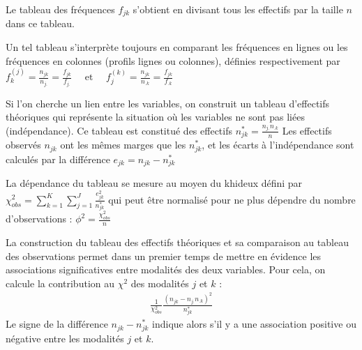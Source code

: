 \documentclass[letterpaper,10pt,french]{sphinxmanual}
\begin{document}
\sphinxAtStartPar
Le tableau des fréquences \(f_{jk}\) s’obtient en divisant tous les effectifs par la taille \(n\) dans ce tableau.

\sphinxAtStartPar
Un tel tableau s’interprète toujours en comparant les fréquences en lignes ou les fréquences en colonnes (profils lignes ou colonnes), définies  respectivement par
\(f_k^{(j)}= \frac{n_{jk}}{n_{j.}}=\frac{f_{jk}}{f_{j.}}\quad\textrm{ et }\quad f_j^{(k)}= \frac{n_{jk}}{n_{.k}}=\frac{f_{jk}}{f_{.k}}\)

\sphinxAtStartPar
Si l’on cherche un lien entre les variables, on construit un tableau d’effectifs théoriques qui représente la situation où les variables ne sont pas liées (indépendance). Ce tableau est constitué des effectifs
\(n_{jk}^*=\frac{n_{j.}n_{.k}}{n}\)
Les effectifs observés \(n_{jk}\) ont les mêmes marges que les \(n_{jk}^*\), et les écarts à l’indépendance sont calculés par la différence \(e_{jk}=n_{jk}-n_{jk}^*\)

\ignorespaces 
\sphinxAtStartPar
La dépendance du tableau se mesure au moyen du khi\sphinxhyphen{}deux défini par
\(\chi^2_{obs}= \displaystyle\sum_{k=1}^K\displaystyle\sum_{j=1}^J\frac{e_{jk}^2}{n_{jk}^*}\)
qui peut être normalisé pour ne plus dépendre du nombre d’observations :
\(\phi^2=\frac{\chi^2_{obs}}{n}\)

\sphinxAtStartPar
La construction du tableau des effectifs théoriques et sa comparaison au tableau des observations permet dans un premier temps de mettre en évidence les associations significatives entre modalités des deux variables. Pour cela, on calcule la contribution au \(\chi^2\) des modalités \(j\) et \(k\) :
\begin{equation*}
\begin{split}\frac{1}{\chi^2_{obs}}\frac{\left (n_{jk}-n_{j.}n_{.k}\right )^2}{n_{jk}^*}\end{split}
\end{equation*}
\sphinxAtStartPar
Le signe de la différence \(n_{jk}-n_{jk}^*\) indique alors s’il y a une association positive ou négative entre les modalités \(j\) et \(k\).
\end{document}
